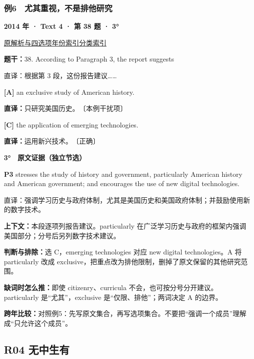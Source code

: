 \documentclass[11pt,a4paper]{article}
\begin{document}
\subsubsection{例6　尤其重视，不是排他研究}\label{case-2014-T4-Q38}
\noindent\textbf{2014 年 · Text 4 · 第 38 题 · 3°}\par\noindent \href{https://zj139.github.io/math-notes/english/d0543caa2ebd73b99c00cc00/\#q38}{原解析与四选项}\quad \hyperref[idx-2014-T4-Q38]{年份索引}\quad \hyperref[class-R03]{分类索引}\par\smallskip
\noindent\textbf{题干：}38. According to Paragraph 3, the report suggests\par
直译：根据第 3 段，这份报告建议……\par
{}\noindent\textbf{[A]} an exclusive study of American history.\par\nopagebreak
\noindent\textbf{直译：}只研究美国历史。　〔本例干扰项〕\par
{}\noindent\textbf{[C]} the application of emerging technologies.\par\nopagebreak
\noindent\textbf{直译：}运用新兴技术。　〔正确〕\par
\begin{evidence}\textbf{3°　原文证据（独立节选）}\par
\textbf{P3} stresses the study of history and government, particularly American history and American government; and encourages the use of new digital technologies.\par 直译：强调学习历史与政府体制，尤其是美国历史和美国政府体制；并鼓励使用新的数字技术。\par
\end{evidence}
\noindent\textbf{上下文：}本段逐项列报告建议。particularly 在广泛学习历史与政府的框架内强调美国部分；分号后另列数字技术建议。\par
\noindent\textbf{判断与排除：}选 C，emerging technologies 对应 new digital technologies。A 将 particularly 改成 exclusive，把重点改为排他限制，删掉了原文保留的其他研究范围。\par
\noindent\textbf{缺词时怎么推：}即使 citizenry、curricula 不会，也可按分号分开建议。particularly 是“尤其”，exclusive 是“仅限、排他”；两词决定 A 的边界。\par
\noindent\textbf{跨年比较：}对照例5：先写原文集合，再写选项集合。不要把“强调一个成员”理解成“只允许这个成员”。\par
\clearpage
\subsection{R04 无中生有}
\end{document}

